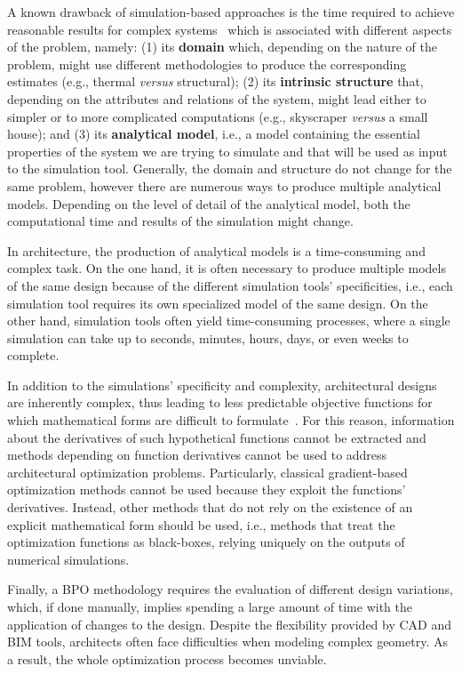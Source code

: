 	A known drawback of simulation-based approaches is the time required to achieve reasonable results for complex systems~\cite{Law1991} which is associated with different aspects of the problem, namely: (1) its \textbf{domain} which, depending on the nature of the problem, might use different methodologies to produce the corresponding estimates (e.g., thermal \textit{versus} structural); (2) its \textbf{intrinsic structure} that, depending on the attributes and relations of the system, might lead either to simpler or to more complicated computations (e.g., skyscraper \textit{versus} a small house); and (3) its \textbf{analytical model}, i.e., a model containing the essential properties of the system we are trying to simulate and that will be used as input to the simulation tool. Generally, the domain and structure do not change for the same problem, however there are numerous ways to produce multiple analytical models. Depending on the level of detail of the analytical model, both the computational time and results of the simulation might change. 

	In architecture, the production of analytical models is a time-consuming and complex task. On the one hand, it is often necessary to produce multiple models of the same design because of the different simulation tools' specificities, i.e., each simulation tool requires its own specialized model of the same design. On the other hand, simulation tools often yield time-consuming processes, where a single simulation can take up to seconds, minutes, hours, days, or even weeks to complete. 
	
	In addition to the simulations' specificity and complexity, architectural designs are inherently complex, thus leading to less predictable objective functions for which mathematical forms are difficult to formulate~\cite{Machairas2014}. For this reason, information about the derivatives of such hypothetical functions cannot be extracted and methods depending on function derivatives cannot be used to address architectural optimization problems. Particularly, classical gradient-based optimization methods cannot be used because they exploit the functions' derivatives. Instead, other methods that do not rely on the existence of an explicit mathematical form should be used, i.e., methods that treat the optimization functions as black-boxes, relying uniquely on the outputs of numerical simulations.
	
	Finally, a \ac{BPO} methodology requires the evaluation of different design variations, which, if done manually, implies spending a large amount of time with the application of changes to the design. Despite the flexibility provided by \ac{CAD} and \ac{BIM} tools, architects often face difficulties when modeling complex geometry. As a result, the whole optimization process becomes unviable.
	
